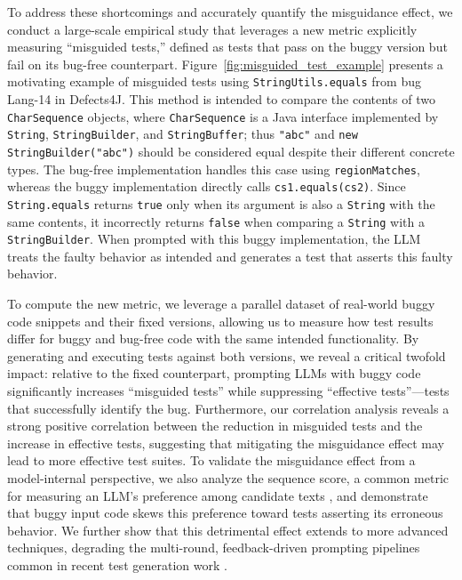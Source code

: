 \documentclass[acmsmall]{acmart}
\begin{document}
To address these shortcomings and accurately quantify the misguidance effect, we conduct a large-scale empirical study that leverages a new metric explicitly measuring ``misguided tests,'' defined as tests that pass on the buggy version but fail on its bug-free counterpart. Figure~\ref{fig:misguided_test_example} presents a motivating example of misguided tests using \texttt{StringUtils.equals} from bug Lang-14 in Defects4J. This method is intended to compare the contents of two \texttt{CharSequence} objects, where \texttt{CharSequence} is a Java interface implemented by \texttt{String}, \texttt{StringBuilder}, and \texttt{StringBuffer}; thus \texttt{"abc"} and \texttt{new StringBuilder("abc")} should be considered equal despite their different concrete types. The bug-free implementation handles this case using \texttt{regionMatches}, whereas the buggy implementation directly calls \texttt{cs1.equals(cs2)}. Since \texttt{String.equals} returns \texttt{true} only when its argument is also a \texttt{String} with the same contents, it incorrectly returns \texttt{false} when comparing a \texttt{String} with a \texttt{StringBuilder}. When prompted with this buggy implementation, the LLM treats the faulty behavior as intended and generates a test that asserts this faulty behavior. 

To compute the new metric, we leverage a parallel dataset of real-world buggy code snippets and their fixed versions, allowing us to measure how test results differ for buggy and bug-free code with the same intended functionality. By generating and executing tests against both versions, we reveal a critical twofold impact: relative to the fixed counterpart, prompting LLMs with buggy code significantly increases ``misguided tests'' while suppressing ``effective tests''---tests that successfully identify the bug. Furthermore, our correlation analysis reveals a strong positive correlation between the reduction in misguided tests and the increase in effective tests, suggesting that mitigating the misguidance effect may lead to more effective test suites. To validate the misguidance effect from a model-internal perspective, we also analyze the sequence score, a common metric for measuring an LLM's preference among candidate texts \cite{LMareFew-Shot-Learner, DetectGPT, Holtzman2020TheCuriousCase}, and demonstrate that buggy input code skews this preference toward tests asserting its erroneous behavior. We further show that this detrimental effect extends to more advanced techniques, degrading the multi-round, feedback-driven prompting pipelines common in recent test generation work \cite{EvalImprChatgptUTGenFSE2024, testforge_multi_round, ChatUniTestFSE2024Demo}.
 
\end{document}
